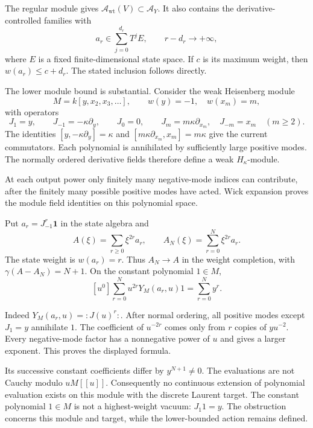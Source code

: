 The regular module gives
\(\mathscr A_{\mathrm{wt}}(V)\subset\mathscr A_Y\).
It also contains the derivative-controlled
families with
\[
 a_r\in\sum_{j=0}^{d_r}T^jE,\qquad
                         r-d_r\longrightarrow+\infty,
\]
where \(E\) is a fixed finite-dimensional
state space. If \(c\) is its maximum
weight, then \(w(a_r)\leq c+d_r\).
The stated inclusion follows directly.

The lower module bound is substantial.
Consider the weak Heisenberg module
\[
 M=k[y,x_2,x_3,\ldots],\qquad
                         w(y)=-1,\quad w(x_m)=m,
\]
with operators
\begin{equation}\label{v4-eq:singular-unbounded-module}
 J_1=y,\qquad J_{-1}=-\kappa\partial_y,\qquad J_0=0,
 \qquad
 J_m=m\kappa\partial_{x_m},\quad J_{-m}=x_m\quad(m\geq2).
\end{equation}
The identities
\([y,-\kappa\partial_y]=\kappa\) and
\([m\kappa\partial_{x_m},x_m]=m\kappa\)
give the current commutators.
Each polynomial is annihilated by sufficiently
large positive modes. The normally ordered
derivative fields therefore define a weak
\(H_\kappa\)-module.

At each output power only finitely many
negative-mode indices can contribute,
after the finitely many possible positive
modes have acted. Wick expansion proves
the module field identities on this
polynomial space.

Put \(a_r=J_{-1}^r\mathbf1\) in the
state algebra and
\[
                  A(\xi)=\sum_{r\geq0}\xi^{2r}a_r,
 \qquad
                  A_N(\xi)=\sum_{r=0}^N\xi^{2r}a_r.
\]
The state weight is \(w(a_r)=r\).
Thus \(A_N\to A\) in the weight completion,
with \(\gamma(A-A_N)=N+1\).
On the constant polynomial \(1\in M\),
\begin{equation}\label{v4-eq:singular-unbounded-evaluation}
       [u^0]\sum_{r=0}^N u^{2r}Y_M(a_r,u)1
                                      =\sum_{r=0}^Ny^r.
\end{equation}

Indeed \(Y_M(a_r,u)=:J(u)^r:\).
After normal ordering, all positive modes
except \(J_1=y\) annihilate \(1\).
The coefficient of \(u^{-2r}\) comes only
from \(r\) copies of \(yu^{-2}\).
Every negative-mode factor has a nonnegative
power of \(u\) and gives a larger exponent.
This proves the displayed formula.

Its successive constant coefficients differ
by \(y^{N+1}\ne0\). The evaluations are
not Cauchy modulo \(uM[[u]]\).
Consequently no continuous extension of
polynomial evaluation exists on this
module with the discrete Laurent target.
The constant polynomial \(1\in M\)
is not a highest-weight vacuum:
\(J_1 1=y\).
The obstruction concerns this module
and target, while the lower-bounded
action remains defined.

